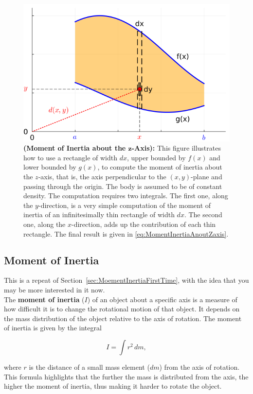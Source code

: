 \begin{figure}[ht]%
\centering
\includegraphics[width=0.6\columnwidth]{graphics/Chap06/MomentOfInertiaAboutZaxis.png}
    \caption[]{\textbf{(Moment of Inertia about the $\bm{z}$-Axis):} This figure illustrates how to use a rectangle of width $dx$, upper bounded by $f(x)$ and lower bounded by $g(x)$, to compute the moment of inertia about the $z$-axis, that is, the axis perpendicular to the $(x,y)$-plane and passing through the origin. The body is assumed to be of constant density. The computation requires two integrals. The first one, along the $y$-direction, is a very simple computation of the moment of inertia of an infinitesimally thin rectangle of width $dx$. The second one, along the $x$-direction, adds up the contribution of each thin rectangle. The final result is given in \eqref{eq:MomentInertiaAnoutZaxis}.}
    \label{fig:MomentInertiaAnoutZaxis}
\end{figure}

\subsection{Moment of Inertia}

This is a repeat of Section~\ref{sec:MoementInertiaFirstTime}, with the idea that you may be more interested in it now.\\

The \textbf{moment of inertia} (\( I \)) of an object about a specific axis is a measure of how difficult it is to change the rotational motion of that object. It depends on the mass distribution of the object relative to the axis of rotation. The moment of inertia is given by the integral

\[
I = \int r^2 \, dm,
\]

where \( r \) is the distance of a small mass element (\( dm \)) from the axis of rotation. This formula highlights that the further the mass is distributed from the axis, the higher the moment of inertia, thus making it harder to rotate the object.


